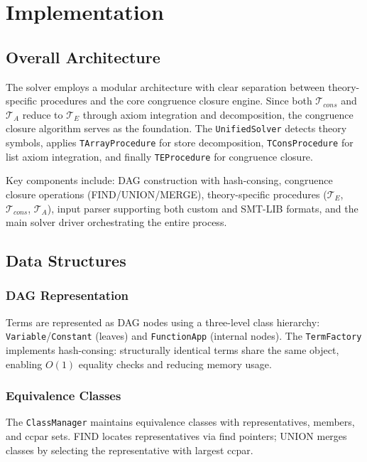 \documentclass[11pt,a4paper]{article}
\begin{document}
\section{Implementation}

\subsection{Overall Architecture}

The solver employs a modular architecture with clear separation between theory-specific procedures and the core congruence closure engine. Since both $\mathcal{T}_{cons}$ and $\mathcal{T}_A$ reduce to $\mathcal{T}_E$ through axiom integration and decomposition, the congruence closure algorithm serves as the foundation. The \texttt{UnifiedSolver} detects theory symbols, applies \texttt{TArrayProcedure} for store decomposition, \texttt{TConsProcedure} for list axiom integration, and finally \texttt{TEProcedure} for congruence closure.

Key components include: DAG construction with hash-consing, congruence closure operations (FIND/UNION/MERGE), theory-specific procedures ($\mathcal{T}_E$, $\mathcal{T}_{cons}$, $\mathcal{T}_A$), input parser supporting both custom and SMT-LIB formats, and the main solver driver orchestrating the entire process.

\subsection{Data Structures}

\subsubsection{DAG Representation}

Terms are represented as DAG nodes using a three-level class hierarchy: \texttt{Variable}/\texttt{Constant} (leaves) and \texttt{FunctionApp} (internal nodes). The \texttt{TermFactory} implements hash-consing: structurally identical terms share the same object, enabling $O(1)$ equality checks and reducing memory usage.


\subsubsection{Equivalence Classes}

The \texttt{ClassManager} maintains equivalence classes with representatives, members, and ccpar sets. FIND locates representatives via find pointers; UNION merges classes by selecting the representative with largest ccpar.
\end{document}
